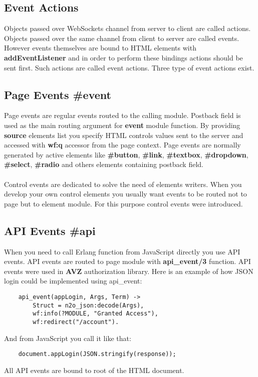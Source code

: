\subsection*{Event Actions}
Objects passed over WebSockets channel from server to client are called actions.
Objects passed over the same channel from client to server are called events. However
events themselves are bound to HTML elements with {\bf addEventListener} and in order to perform these bindings
actions should be sent first. Such actions are called event actions. Three type
of event actions exist.

\subsection{Page Events \#event}
Page events are regular events routed to the calling module. Postback field is used as the main
routing argument for {\bf event} module function. By providing {\bf source} elements list you specify
HTML controls values sent to the server and accessed with {\bf wf:q} accessor from the page context.
Page events are normally generated by active elements like {\bf \#button}, {\bf \#link},
{\bf \#textbox}, {\bf \#dropdown}, {\bf \#select}, {\bf \#radio} and others elements
containing postback field.

\paragraph{}
Control events are dedicated to solve the need of elements writers. When you develop your
own control elements you usually want events to be routed not to page but to element module.
For this purpose control events were introduced.

\subsection{API Events \#api}
When you need to call Erlang function from JavaScript directly you use API events.
API events are routed to page module with {\bf api\_event/3} function. API events were
used in {\bf AVZ} authorization library. Here is an example of how JSON login could be
implemented using api\_event:

\vspace{1\baselineskip}
\begin{lstlisting}
    api_event(appLogin, Args, Term) ->
        Struct = n2o_json:decode(Args),
        wf:info(?MODULE, "Granted Access"),
        wf:redirect("/account").
\end{lstlisting}
\vspace{1\baselineskip}
And from JavaScript you call it like that:
\vspace{1\baselineskip}
\begin{lstlisting}
    document.appLogin(JSON.stringify(response));
\end{lstlisting}
\vspace{1\baselineskip}
All API events are bound to root of the HTML document.


